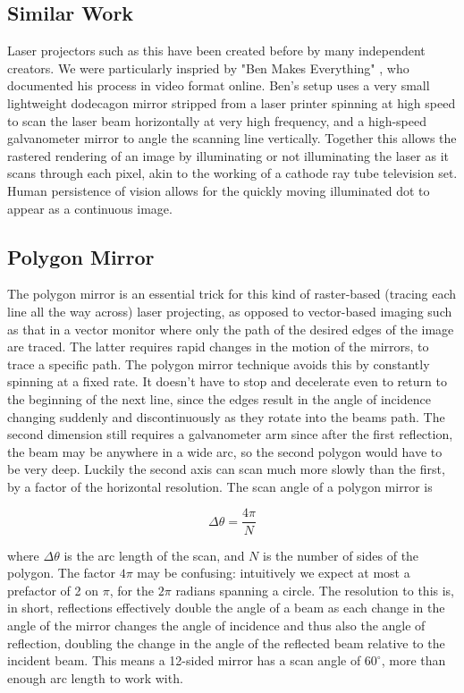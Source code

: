 \documentclass[twocolumn]{revtex4-2}
\begin{document}
\subsection{Similar Work}

Laser projectors such as this have been created before by many independent creators. We were particularly inspried by "Ben Makes Everything" \cite{ben}, who documented his process in video format online. Ben's setup uses a very small lightweight dodecagon mirror stripped from a laser printer spinning at high speed to scan the laser beam horizontally at very high frequency, and a high-speed galvanometer mirror to angle the scanning line vertically. Together this allows the rastered rendering of an image by illuminating or not illuminating the laser as it scans through each pixel, akin to the working of a cathode ray tube television set. Human persistence of vision allows for the quickly moving illuminated dot to appear as a continuous image.

\subsection{Polygon Mirror}

The polygon mirror is an essential trick for this kind of raster-based (tracing each line all the way across) laser projecting, as opposed to vector-based imaging such as that in a vector monitor where only the path of the desired edges of the image are traced. The latter requires rapid changes in the motion of the mirrors, to trace a specific path. The polygon mirror technique avoids this by constantly spinning at a fixed rate. It doesn't have to stop and decelerate even to return to the beginning of the next line, since the edges result in the angle of incidence changing suddenly and discontinuously as they rotate into the beams path. The second dimension still requires a galvanometer arm since after the first reflection, the beam may be anywhere in a wide arc, so the second polygon would have to be very deep. Luckily the second axis can scan much more slowly than the first, by a factor of the horizontal resolution. The scan angle of a polygon mirror is 

\begin{equation}
    \Delta \theta = \frac{4 \pi}{N}
    \label{eq:scan}
\end{equation}

where $\Delta \theta$ is the arc length of the scan, and $N$ is the number of sides of the polygon. The factor $4\pi$ may be confusing: intuitively we expect at most a prefactor of 2 on $\pi$, for the $2\pi$ radians spanning a circle. The resolution to this is, in short, reflections effectively double the angle of a beam as each change in the angle of the mirror changes the angle of incidence and thus also the angle of reflection, doubling the change in the angle of the reflected beam relative to the incident beam. This means a 12-sided  mirror has a scan angle of $60^{\circ}$, more than enough arc length to work with.
\end{document}
